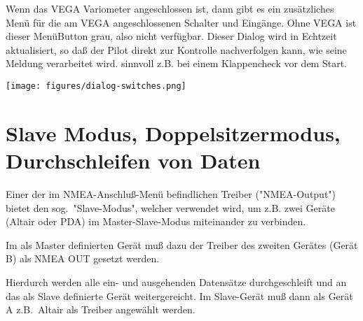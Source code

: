 Wenn das VEGA Variometer angeschlossen ist, dann gibt es ein zusätzliches Menü für die am VEGA angeschlossenen Schalter und Eingänge. Ohne VEGA ist dieser MenüButton grau, also nicht verfügbar.
Dieser Dialog wird in Echtzeit aktualisiert, so daß der Pilot direkt zur Kontrolle nachverfolgen kann, wie seine Meldung verarbeitet wird. sinnvoll z.B. bei einem Klappencheck vor dem Start.


\begin{center}
\texttt{[image: figures/dialog-switches.png]}
\end{center}
\section{Slave Modus, Doppelsitzermodus,  Durchschleifen von Daten}

Einer der im NMEA-Anschluß-Menü befindlichen Treiber ("NMEA-Output") bietet den sog.\   "Slave-Modus", welcher verwendet wird,  um z.B. zwei Geräte  (\textsf{Altair} oder \textsf{PDA})  im Master-Slave-Modus miteinander zu verbinden. 


Im als Master definierten Gerät muß dazu der Treiber des zweiten  Gerätes (Gerät B) als NMEA OUT gesetzt werden.

Hierdurch werden alle ein- und ausgehenden Datensätze  durchgeschleift und an das als Slave definierte Gerät weitergereicht.
Im Slave-Gerät muß dann als Gerät A z.B.\ \textsf{Altair} als Treiber angewählt werden.

